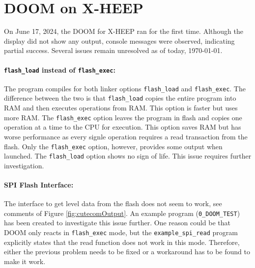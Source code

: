 \section{DOOM on X-HEEP}

On June 17, 2024, the DOOM for X-HEEP ran for the first time. Although the display did not show any output, console messages were observed, indicating partial success. Several issues remain unresolved as of today, \today.

\paragraph{\texttt{flash\_load} instead of \texttt{flash\_exec}:} The program compiles for both linker options \texttt{flash\_load} and \texttt{flash\_exec}. The difference between the two is that \texttt{flash\_load} copies the entire program into RAM and then executes operations from RAM. This option is faster but uses more RAM. The \texttt{flash\_exec} option leaves the program in flash and copies one operation at a time to the CPU for execution. This option saves RAM but has worse performance as every signle operation requires a read transaction from the flash. Only the \texttt{flash\_exec} option, however, provides some output when launched. The \texttt{flash\_load} option shows no sign of life. This issue requires further investigation.

\paragraph{SPI Flash Interface:} The interface to get level data from the flash does not seem to work, see comments of Figure \ref{fig:cutecomOutput}. An example program (\texttt{0\_DOOM\_TEST})\cite{projectRepo} has been created to investigate this issue further. One reason could be that DOOM only reacts in \texttt{flash\_exec} mode, but the \texttt{example\_spi\_read} program explicitly states that the read function does not work in this mode. Therefore, either the previous problem needs to be fixed or a workaround has to be found to make it work.

\newpage

